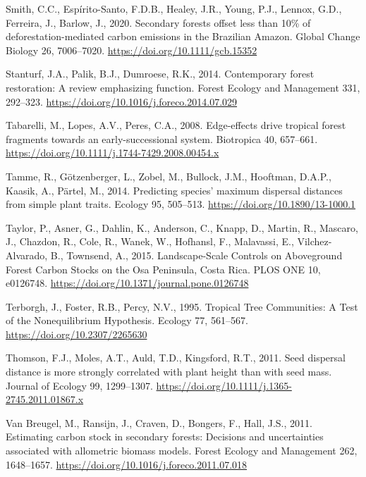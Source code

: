 \documentclass[
  12pt,
]{article}
\newlength{\cslhangindent}
\newlength{\cslentryspacingunit} %
\newenvironment{CSLReferences}[2] %
 {%
  \setlength{\parindent}{0pt}
  \ifodd #1
  \let\oldpar\par
  \def\par{\hangindent=\cslhangindent\oldpar}
  \fi
  \setlength{\parskip}{#2\cslentryspacingunit}
 }%
 {}
\begin{document}
\begin{CSLReferences}{1}{0}
\leavevmode{}%
Smith, C.C., Espírito-Santo, F.D.B., Healey, J.R., Young, P.J., Lennox, G.D., Ferreira, J., Barlow, J., 2020. Secondary forests offset less than 10\% of deforestation-mediated carbon emissions in the {Brazilian Amazon}. Global Change Biology 26, 7006--7020. \url{https://doi.org/10.1111/gcb.15352}

\leavevmode{}%
Stanturf, J.A., Palik, B.J., Dumroese, R.K., 2014. Contemporary forest restoration: {A} review emphasizing function. Forest Ecology and Management 331, 292--323. \url{https://doi.org/10.1016/j.foreco.2014.07.029}

\leavevmode{}%
Tabarelli, M., Lopes, A.V., Peres, C.A., 2008. Edge-effects drive tropical forest fragments towards an early-successional system. Biotropica 40, 657--661. \url{https://doi.org/10.1111/j.1744-7429.2008.00454.x}

\leavevmode{}%
Tamme, R., Götzenberger, L., Zobel, M., Bullock, J.M., Hooftman, D.A.P., Kaasik, A., Pärtel, M., 2014. Predicting species' maximum dispersal distances from simple plant traits. Ecology 95, 505--513. \url{https://doi.org/10.1890/13-1000.1}

\leavevmode{}%
Taylor, P., Asner, G., Dahlin, K., Anderson, C., Knapp, D., Martin, R., Mascaro, J., Chazdon, R., Cole, R., Wanek, W., Hofhansl, F., Malavassi, E., Vilchez-Alvarado, B., Townsend, A., 2015. Landscape-{Scale Controls} on {Aboveground Forest Carbon Stocks} on the {Osa Peninsula}, {Costa Rica}. PLOS ONE 10, e0126748. \url{https://doi.org/10.1371/journal.pone.0126748}

\leavevmode{}%
Terborgh, J., Foster, R.B., Percy, N.V., 1995. Tropical {Tree Communities}: {A Test} of the {Nonequilibrium Hypothesis}. Ecology 77, 561--567. \url{https://doi.org/10.2307/2265630}

\leavevmode{}%
Thomson, F.J., Moles, A.T., Auld, T.D., Kingsford, R.T., 2011. Seed dispersal distance is more strongly correlated with plant height than with seed mass. Journal of Ecology 99, 1299--1307. \url{https://doi.org/10.1111/j.1365-2745.2011.01867.x}

\leavevmode{}%
Van Breugel, M., Ransijn, J., Craven, D., Bongers, F., Hall, J.S., 2011. Estimating carbon stock in secondary forests: {Decisions} and uncertainties associated with allometric biomass models. Forest Ecology and Management 262, 1648--1657. \url{https://doi.org/10.1016/j.foreco.2011.07.018}


\end{CSLReferences}
\end{document}
